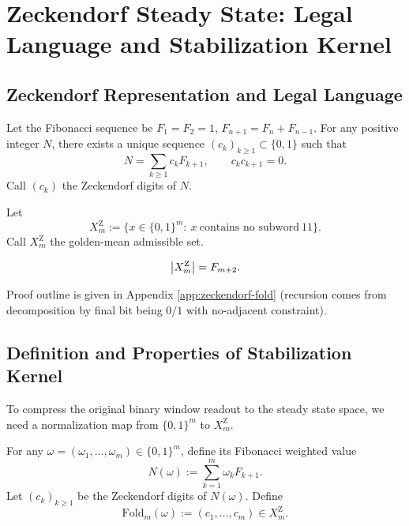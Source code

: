 \section{Zeckendorf Steady State: Legal Language and Stabilization Kernel}

\subsection{Zeckendorf Representation and Legal Language}

\begin{definition}\label{def:zeckendorf}
Let the Fibonacci sequence be $F_1=F_2=1$, $F_{n+1}=F_n+F_{n-1}$. For any positive integer $N$, there exists a unique sequence $(c_k)_{k\ge 1}\subset\{0,1\}$ such that
\[
N=\sum_{k\ge 1} c_k F_{k+1},\qquad c_k c_{k+1}=0.
\]
Call $(c_k)$ the Zeckendorf digits of $N$.
\end{definition}

\begin{definition}\label{def:zeckendorf-language}
Let
\[
X_m^{\mathrm Z}:=\{x\in\{0,1\}^m:\ x\ \text{contains no subword}\ 11\}.
\]
Call $X_m^{\mathrm Z}$ the golden-mean admissible set.
\end{definition}

\begin{theorem}[Counting]\label{thm:zeckendorf-count}
\[
\left\lvert X_m^{\mathrm Z}\right\rvert=F_{m+2}.
\]
\end{theorem}

\begin{remark}
Proof outline is given in Appendix \ref{app:zeckendorf-fold} (recursion comes from decomposition by final bit being $0/1$ with no-adjacent constraint).
\end{remark}

\subsection{Definition and Properties of Stabilization Kernel}

To compress the original binary window readout to the steady state space, we need a normalization map from $\{0,1\}^m$ to $X_m^{\mathrm Z}$.

\begin{definition}\label{def:fold}
For any $\omega=(\omega_1,\dots,\omega_m)\in\{0,1\}^m$, define its Fibonacci weighted value
\[
N(\omega):=\sum_{k=1}^{m}\omega_k F_{k+1}.
\]
Let $(c_k)_{k\ge 1}$ be the Zeckendorf digits of $N(\omega)$. Define
\[
\mathrm{Fold}_m(\omega):=(c_1,\dots,c_m)\in X_m^{\mathrm Z}.
\]
\end{definition}

